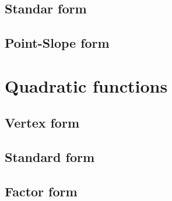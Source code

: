 \documentclass{article}
\begin{document}
	\subsection{Standar form}
	\subsection{Point-Slope form}
\section{Quadratic functions}
	\subsection{Vertex form}
	\subsection{Standard form}
	\subsection{Factor form}
\end{document}
